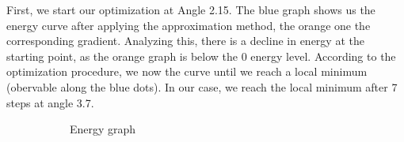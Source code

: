 \documentclass[
  letterpaper,
  DIV=11,
  numbers=noendperiod]{scrartcl}
\begin{document}
First, we start our optimization at Angle 2.15. The blue graph shows us
the energy curve after applying the approximation method, the orange one
the corresponding gradient. Analyzing this, there is a decline in energy
at the starting point, as the orange graph is below the 0 energy level.
According to the optimization procedure, we now the curve until we reach
a local minimum (obervable along the blue dots). In our case, we reach
the local minimum after 7 steps at angle 3.7.

\begin{figure}

\begin{minipage}{0.50\linewidth}

\begin{figure}[H]


\caption{\label{fig-surus}Energy graph}

\end{figure}%

\end{minipage}%
%
\begin{minipage}{0.50\linewidth}

\begin{figure}[H]

\end{figure}
\end{minipage}
\end{figure}
\end{document}
